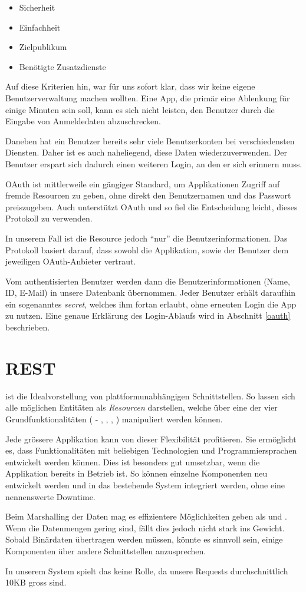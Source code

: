 \begin{itemize}
\item Sicherheit
\item Einfachheit
\item Zielpublikum
\item Benötigte Zusatzdienste
\end{itemize}

Auf diese Kriterien hin, war für uns sofort klar, dass wir keine eigene Benutzerverwaltung machen wollten.
Eine App, die primär eine Ablenkung für einige Minuten sein soll, kann es sich nicht leisten, den Benutzer durch die Eingabe von Anmeldedaten abzuschrecken.

Daneben hat ein Benutzer bereits sehr viele Benutzerkonten bei verschiedensten Diensten.
Daher ist es auch naheliegend, diese Daten wiederzuverwenden.
Der Benutzer erspart sich dadurch einen weiteren Login, an den er sich erinnern muss.

\Gls{OAuth} ist mittlerweile ein gängiger Standard, um Applikationen Zugriff auf fremde Resourcen zu geben, ohne direkt den Benutzernamen und das Passwort preiszugeben.
Auch  unterstützt \gls{OAuth} und so fiel die Entscheidung leicht, dieses Protokoll zu verwenden.

In unserem Fall ist die Resource jedoch "`nur"' die Benutzerinformationen.
Das Protokoll basiert darauf, dass sowohl die Applikation, sowie der Benutzer dem jeweiligen \gls{OAuth}-Anbieter vertraut.

Vom authentisierten Benutzer werden dann die Benutzerinformationen (Name, ID, E-Mail) in unsere Datenbank übernommen.
Jeder Benutzer erhält daraufhin ein sogenanntes \emph{secret}, welches ihm fortan erlaubt, ohne erneuten Login die App zu nutzen.
Eine genaue Erklärung des Login-Ablaufs wird in Abschnitt \ref{oauth} beschrieben.

\section{REST}
 ist die Idealvorstellung von plattformunabhängigen Schnittstellen.
So lassen sich alle möglichen Entitäten als \emph{Resourcen} darstellen, welche über eine der vier Grundfunktionalitäten ( - , , , ) manipuliert werden können.

Jede grössere Applikation kann von dieser Flexibilität profitieren.
Sie ermöglicht es, dass Funktionalitäten mit beliebigen Technologien und Programmiersprachen entwickelt werden können.
Dies ist besonders gut umsetzbar, wenn die Applikation bereits in Betrieb ist.
So können einzelne Komponenten neu entwickelt werden und in das bestehende System integriert werden, ohne eine nennenswerte Downtime.

Beim \gls{Marshalling} der Daten mag es effizientere Möglichkeiten geben als  und .
Wenn die Datenmengen gering sind, fällt dies jedoch nicht stark ins Gewicht.
Sobald Binärdaten übertragen werden müssen, könnte es sinnvoll sein, einige Komponenten über andere Schnittstellen anzusprechen.

In unserem System spielt das keine Rolle, da unsere Requests durchschnittlich 10KB gross sind.